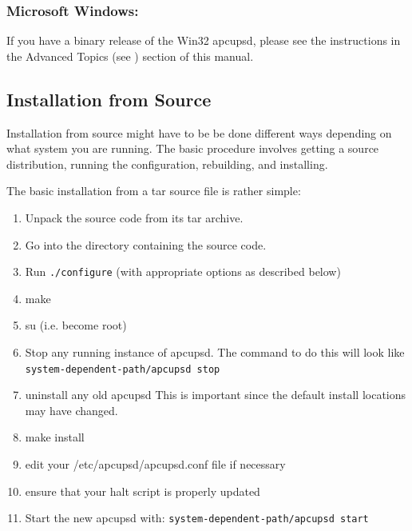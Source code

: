 \label{Microsoft-Windows}

\subsubsection*{Microsoft Windows:}

\label{index-Installing_002c-Microsoft-21}
If you have a binary release of the Win32 apcupsd, please see the instructions
in the Advanced Topics (see 
) section of this manual. 

\label{Installation-from-Source}

\subsection*{Installation from Source}

Installation from source might have to be be done different ways depending on
what system you are running. The basic procedure involves getting a source
distribution, running the configuration, rebuilding, and installing.  

The basic installation from a tar source file is rather simple:  

\begin{enumerate}
\item Unpack the source code from its tar archive.  
\item Go into the directory containing the source code.  
\item Run {\tt ./configure} (with appropriate options as described below)  
\item make  
\item su (i.e. become root)  
\item Stop any running instance of apcupsd.  The command to do this will look
   like {\tt \lt{}system-dependent-path\gt{}/apcupsd stop}  
\item uninstall any old apcupsd This is important since the default install
   locations may have changed.  
\item make install  
\item edit your /etc/apcupsd/apcupsd.conf file if necessary  
\item ensure that your halt script is properly updated  
\item Start the new apcupsd with: {\tt \lt{}system-dependent-path\gt{}/apcupsd
   start}  
   \end{enumerate}


